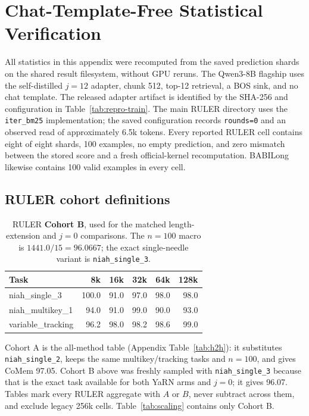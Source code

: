 \FloatBarrier
\section{Chat-Template-Free Statistical Verification}
\label{app:statistics}

All statistics in this appendix were recomputed from the saved prediction
shards on the shared result filesystem, without GPU reruns. The Qwen3-8B
flagship uses the self-distilled $j{=}12$ adapter, chunk 512, top-12 retrieval,
a BOS sink, and no chat template. The released adapter artifact is identified by the SHA-256 and configuration in
Table~\ref{tab:repro-train}. The main RULER directory uses the
\texttt{iter\_bm25} implementation; the saved configuration records
\texttt{rounds=0} and an observed read of approximately 6.5k tokens. Every reported RULER cell contains eight of eight shards, 100
examples, no empty prediction, and zero mismatch between the stored score and a
fresh official-kernel recomputation. BABILong likewise contains 100 valid
examples in every cell.

\subsection{RULER cohort definitions}
\begin{table}[t]
\centering
\small
\setlength{\tabcolsep}{4pt}
\begin{tabular}{@{}lrrrrr@{}}
\toprule
\textbf{Task} & \textbf{8k} & \textbf{16k} & \textbf{32k} & \textbf{64k} & \textbf{128k} \\
\midrule
niah\_single\_3 & 100.0 & 91.0 & 97.0 & 98.0 & 98.0 \\
niah\_multikey\_1 & 94.0 & 91.0 & 99.0 & 90.0 & 93.0 \\
variable\_tracking & 96.2 & 98.0 & 98.2 & 98.6 & 99.0 \\
\bottomrule
\end{tabular}
\caption{RULER \textbf{Cohort B}, used for the matched length-extension and
$j{=}0$ comparisons. The $n{=}100$ macro is $1441.0/15=96.0667$; the exact
single-needle variant is \texttt{niah\_single\_3}.}
\label{tab:ruler-statistics}
\end{table}

Cohort A is the all-method table (Appendix Table~\ref{tab:h2h}): it substitutes
\texttt{niah\_single\_2}, keeps the same multikey/tracking tasks and $n{=}100$,
and gives CoMem 97.05. Cohort B above was freshly sampled with
\texttt{niah\_single\_3} because that is the exact task available for both YaRN
arms and $j{=}0$; it gives 96.07. Tables mark every RULER aggregate with $A$ or
$B$, never subtract across them, and exclude legacy 256k cells. Table~\ref{tab:scaling}
contains only Cohort B.

